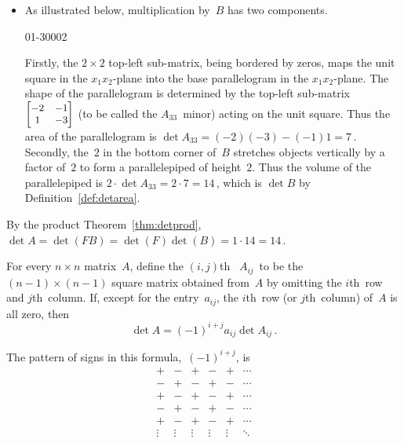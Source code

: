 \begin{example}
\begin{solution}
\begin{itemize}
\begin{itemize}
\item As illustrated  below, multiplication by~\(B\) has two components.
\begin{center}
01{-3}000{2}
\end{center}
Firstly,  the \(2\times2\) top-left sub-matrix, being bordered by zeros, maps the unit square in the \(x_1x_2\)-plane into the base parallelogram in the \(x_1x_2\)-plane.
The shape of the parallelogram is determined by the top-left sub-matrix \(\small\begin{bmatrix} -2&-1\\1&-3 \end{bmatrix}\) (to be called the \(A_{33}\)~minor) acting on the unit square.
Thus the area of the parallelogram is \(\det A_{33}=(-2)(-3)-(-1)1=7\)\,.
Secondly, the~\(2\) in the bottom corner of~\(B\) stretches objects vertically by a factor of~\(2\) to form a parallelepiped of height~\(2\).
Thus the volume of the parallelepiped is \(2\cdot\det A_{33}=2\cdot 7=14\)\,, which is \(\det B\) by Definition~\ref{def:detarea}.

\end{itemize}
By the product Theorem~\ref{thm:detprod},
\(\det A=\det(FB)=\det(F)\det(B)=1\cdot14=14\)\,.

\end{itemize}
\end{solution}
\end{example}











\begin{theorem} \label{thm:rpdet:vii} 
For every \(n\times n\) matrix~\(A\),
define the \((i,j)\)th~ \(A_{ij}\)~to be the \((n-1)\times(n-1)\) square matrix obtained from~\(A\) by omitting the \(i\)th~row and \(j\)th~column.  
If, except for the entry~\(a_{ij}\), the \(i\)th~row (or \(j\)th~column) of~\(A\) is all zero, then 
\begin{equation}
\det A=(-1)^{i+j}a_{ij}\det A_{ij}\,.
\label{eq:rpdet:vii}
\end{equation}
\end{theorem}
The pattern of signs in this formula,~\((-1)^{i+j}\), is 
\begin{equation*}
\begin{matrix} +&-&+&-&+&\cdots
\\-&+&-&+&-&\cdots
\\+&-&+&-&+&\cdots
\\-&+&-&+&-&\cdots
\\+&-&+&-&+&\cdots
\\\vdots&\vdots&\vdots&\vdots&\vdots&\ddots \end{matrix}
\end{equation*}


